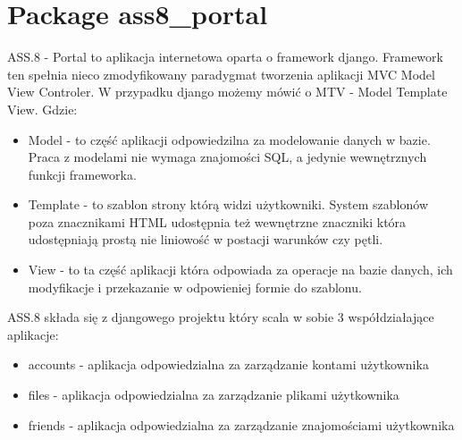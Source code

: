 %
%
%


\section{Package ass8\_portal}

    \label{ass8_portal}
ASS.8 - Portal to aplikacja internetowa oparta o framework django. 
Framework ten spełnia nieco zmodyfikowany paradygmat tworzenia aplikacji 
MVC Model View Controler. W przypadku django możemy mówić o MTV - Model 
Template View. Gdzie:

\begin{itemize}
\setlength{\parskip}{0.6ex}
  \item Model - to część aplikacji odpowiedzilna za modelowanie danych w bazie.
    Praca z modelami nie wymaga znajomości SQL, a jedynie wewnętrznych 
    funkcji frameworka.

  \item Template - to szablon strony którą widzi użytkowniki. System szablonów 
    poza znacznikami HTML udostępnia też wewnętrzne znaczniki która 
    udostępniają prostą nie liniowość w postacji warunków czy pętli.

  \item View - to ta część aplikacji która odpowiada za operacje na bazie 
    danych, ich modyfikacje i przekazanie w odpowieniej formie do szablonu.

\end{itemize}

ASS.8 składa się z djangowego projektu który scala w sobie 3 
współdziałające aplikacje:

\begin{itemize}
\setlength{\parskip}{0.6ex}
  \item accounts - aplikacja odpowiedzialna za zarządzanie kontami użytkownika

  \item files - aplikacja odpowiedzialna za zarządzanie plikami użytkownika

  \item friends - aplikacja odpowiedzialna za zarządzanie znajomościami 
    użytkownika

\end{itemize}


